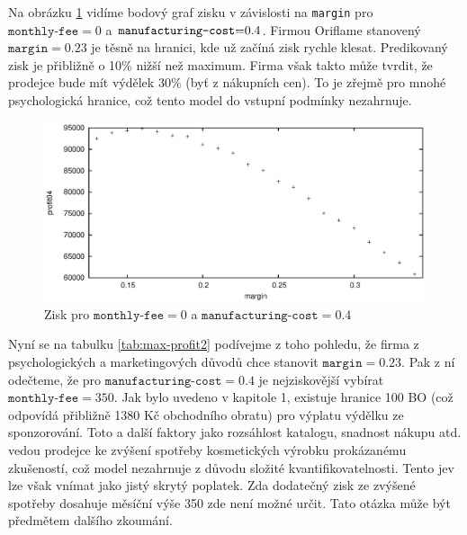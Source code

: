 \documentclass[a4wide,12pt]{report}
\begin{document}
Na obrázku \ref{fig:max-profit-04-f0} vidíme bodový graf zisku v závislosti na \texttt{margin} pro $\texttt{monthly-fee}=0$ a $\mbox{\texttt{manufacturing-cost}=0.4}$. Firmou Oriflame stanovený $\texttt{margin}=0.23$ je těsně na hranici, kde už začíná zisk rychle klesat. Predikovaný zisk je přibližně o 10\% nižší než maximum. Firma však takto může tvrdit, že prodejce bude mít výdělek 30\% (byť z nákupních cen). To je zřejmě pro mnohé psychologická hranice, což tento model do vstupní podmínky nezahrnuje.
\begin{figure}[h]
  \centering
  \includegraphics{max-profit-04-f0.eps}
  \caption{Zisk pro $\texttt{monthly-fee}=0$ a $\texttt{manufacturing-cost}=0.4$}
  \label{fig:max-profit-04-f0}
\end{figure}

Nyní se na tabulku \ref{tab:max-profit2} podívejme z toho pohledu, že firma z psychologických a marketingových důvodů chce stanovit $\texttt{margin}=0.23$. Pak z ní odečteme, že pro $\texttt{manufacturing-cost}=0.4$ je nejziskovější vybírat $\texttt{monthly-fee}=350$. Jak bylo uvedeno v kapitole 1, existuje hranice 100 BO (což odpovídá přibližně 1380 Kč obchodního obratu) pro výplatu výdělku ze sponzorování. Toto a další faktory jako rozsáhlost katalogu, snadnost nákupu atd. vedou prodejce ke zvýšení spotřeby kosmetických výrobku prokázanému zkušeností, což model nezahrnuje z důvodu složité kvantifikovatelnosti. Tento jev lze však vnímat jako jistý skrytý poplatek. Zda dodatečný zisk ze zvýšené spotřeby dosahuje měsíční výše 350 zde není možné určit. Tato otázka může být předmětem dalšího zkoumání.
\end{document}
